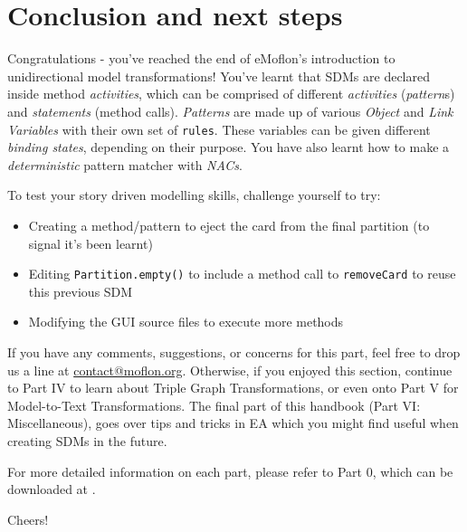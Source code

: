 \genHeader
\section{Conclusion and next steps}

\vspace{0.5cm}

Congratulations - you've reached the end of eMoflon's introduction to unidirectional model transformations! You've learnt that SDMs are declared inside method
\emph{activities}, which can be comprised of different \emph{activities} (\emph{pattern}s) and \emph{statements} (method calls). \emph{Patterns} are made up of
various \emph{Object} and \emph{Link Variables} with their own set of \texttt{rules}. These variables can be given different \emph{binding states}, depending on
their purpose. You have also learnt how to make a \emph{deterministic} pattern matcher with \emph{NACs}.

\vspace{0.5cm}

To test your story driven modelling skills, challenge yourself to try:
\begin{itemize}
\item Creating a method/pattern to eject the card from the final partition (to signal it's been learnt)
\item Editing \texttt{Partition.empty()} to include a method call to \texttt{removeCard} to reuse this previous SDM
\item Modifying the GUI source files to execute more methods
\end{itemize}

\vspace{0.5cm}
	
If you have any comments, suggestions, or concerns for this part, feel free to drop us a line at \href{mailto:contact@moflon.org}{contact@moflon.org}.
Otherwise, if you enjoyed this section, continue to Part IV to learn about Triple Graph Transformations, or even onto Part V for Model-to-Text Transformations.
The final part of this handbook (Part VI: Miscellaneous), goes over tips and tricks in EA which you might find useful when creating SDMs in the future. 

For more detailed information on each part, please refer to Part 0, which can be downloaded at \dlPartZero.
\vspace{0.5cm}

Cheers!
